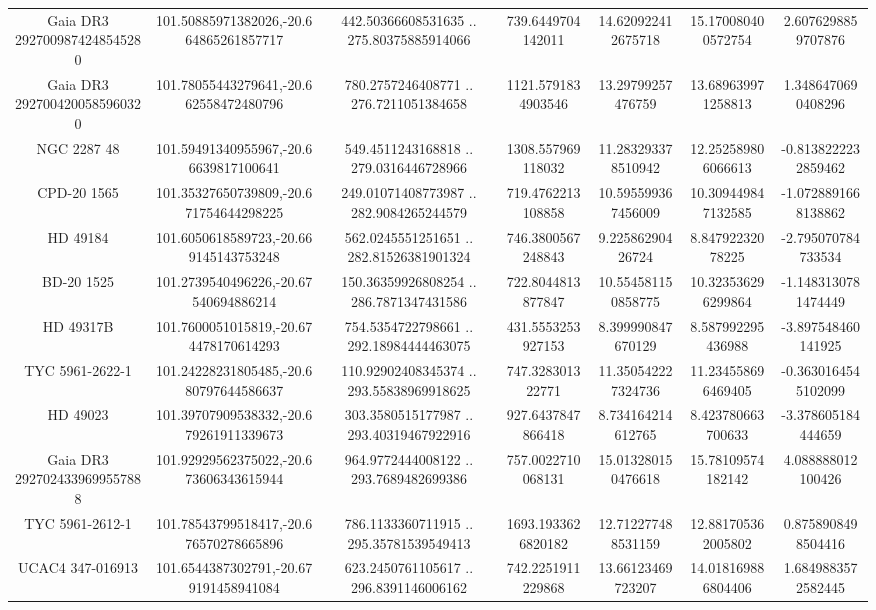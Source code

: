 \begin{table}
\begin{tabular}{ccccccc}
Gaia DR3 2927009874248545280 & 101.50885971382026,-20.664865261857717 & 442.50366608531635 .. 275.80375885914066 & 739.6449704142011 & 14.620922412675718 & 15.170080400572754 & 2.6076298859707876 \\
Gaia DR3 2927004200585960320 & 101.78055443279641,-20.662558472480796 & 780.2757246408771 .. 276.7211051384658 & 1121.5791834903546 & 13.29799257476759 & 13.689639971258813 & 1.3486470690408296 \\
NGC  2287    48 & 101.59491340955967,-20.66639817100641 & 549.4511243168818 .. 279.0316446728966 & 1308.557969118032 & 11.283293378510942 & 12.252589806066613 & -0.8138222232859462 \\
CPD-20  1565 & 101.35327650739809,-20.671754644298225 & 249.01071408773987 .. 282.9084265244579 & 719.4762213108858 & 10.595599367456009 & 10.309449847132585 & -1.0728891668138862 \\
HD  49184 & 101.6050618589723,-20.669145143753248 & 562.0245551251651 .. 282.81526381901324 & 746.3800567248843 & 9.22586290426724 & 8.84792232078225 & -2.795070784733534 \\
BD-20  1525 & 101.2739540496226,-20.67540694886214 & 150.36359926808254 .. 286.7871347431586 & 722.8044813877847 & 10.554581150858775 & 10.323536296299864 & -1.1483130781474449 \\
HD  49317B & 101.7600051015819,-20.674478170614293 & 754.5354722798661 .. 292.18984444463075 & 431.5553253927153 & 8.399990847670129 & 8.587992295436988 & -3.897548460141925 \\
TYC 5961-2622-1 & 101.24228231805485,-20.680797644586637 & 110.92902408345374 .. 293.55838969918625 & 747.328301322771 & 11.350542227324736 & 11.234558696469405 & -0.3630164545102099 \\
HD  49023 & 101.39707909538332,-20.679261911339673 & 303.3580515177987 .. 293.40319467922916 & 927.6437847866418 & 8.734164214612765 & 8.423780663700633 & -3.378605184444659 \\
Gaia DR3 2927024339699557888 & 101.92929562375022,-20.673606343615944 & 964.9772444008122 .. 293.7689482699386 & 757.0022710068131 & 15.013280150476618 & 15.78109574182142 & 4.088888012100426 \\
TYC 5961-2612-1 & 101.78543799518417,-20.676570278665896 & 786.1133360711915 .. 295.35781539549413 & 1693.1933626820182 & 12.712277488531159 & 12.881705362005802 & 0.8758908498504416 \\
UCAC4 347-016913 & 101.6544387302791,-20.679191458941084 & 623.2450761105617 .. 296.8391146006162 & 742.2251911229868 & 13.66123469723207 & 14.018169886804406 & 1.6849883572582445 \\

\end{tabular}
\end{table}
